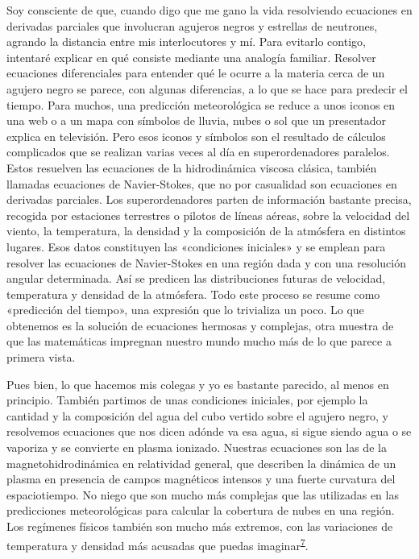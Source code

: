 Soy consciente de que, cuando digo que me gano la vida resolviendo ecuaciones en derivadas parciales que involucran agujeros negros y estrellas de neutrones, agrando la distancia entre mis interlocutores y mí. Para evitarlo contigo, intentaré explicar en qué consiste mediante una analogía familiar. Resolver ecuaciones diferenciales para entender qué le ocurre a la materia cerca de un agujero negro se parece, con algunas diferencias, a lo que se hace para predecir el tiempo. Para muchos, una predicción meteorológica se reduce a unos iconos en una web o a un mapa con símbolos de lluvia, nubes o sol que un presentador explica en televisión. Pero esos iconos y símbolos son el resultado de cálculos complicados que se realizan varias veces al día en superordenadores paralelos. Estos resuelven las ecuaciones de la hidrodinámica viscosa clásica, también llamadas ecuaciones de Navier-Stokes, que no por casualidad son ecuaciones en derivadas parciales. Los superordenadores parten de información bastante precisa, recogida por estaciones terrestres o pilotos de líneas aéreas, sobre la velocidad del viento, la temperatura, la densidad y la composición de la atmósfera en distintos lugares. Esos datos constituyen las «condiciones iniciales» y se emplean para resolver las ecuaciones de Navier-Stokes en una región dada y con una resolución angular determinada. Así se predicen las distribuciones futuras de velocidad, temperatura y densidad de la atmósfera. Todo este proceso se resume como «predicción del tiempo», una expresión que lo trivializa un poco. Lo que obtenemos es la solución de ecuaciones hermosas y complejas, otra muestra de que las matemáticas impregnan nuestro mundo mucho más de lo que parece a primera vista.

Pues bien, lo que hacemos mis colegas y yo es bastante parecido, al menos en principio. También partimos de unas condiciones iniciales, por ejemplo la cantidad y la composición del agua del cubo vertido sobre el agujero negro, y resolvemos ecuaciones que nos dicen adónde va esa agua, si sigue siendo agua o se vaporiza y se convierte en plasma ionizado. Nuestras ecuaciones son las de la magnetohidrodinámica en relatividad general, que describen la dinámica de un plasma en presencia de campos magnéticos intensos y una fuerte curvatura del espaciotiempo. No niego que son mucho más complejas que las utilizadas en las predicciones meteorológicas para calcular la cobertura de nubes en una región. Los regímenes físicos también son mucho más extremos, con las variaciones de temperatura y densidad más acusadas que puedas imaginar\textsuperscript{\hyperlink{note:07-07}{7}}.

